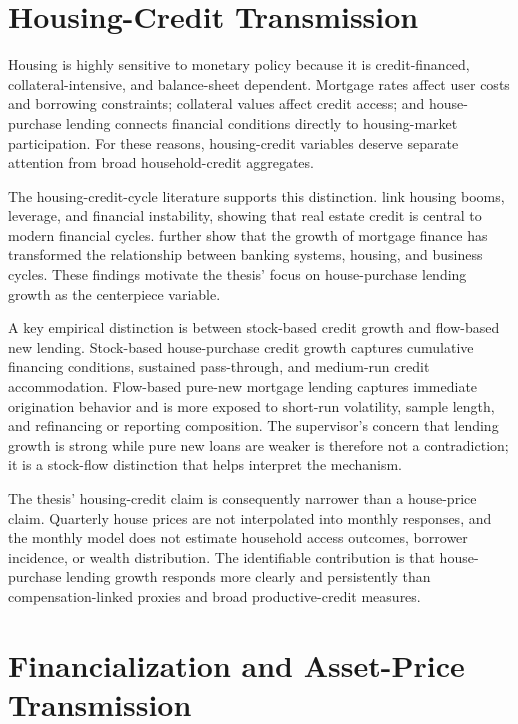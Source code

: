 \section{Housing-Credit Transmission}

Housing is highly sensitive to monetary policy because it is credit-financed, collateral-intensive, and balance-sheet dependent. Mortgage rates affect user costs and borrowing constraints; collateral values affect credit access; and house-purchase lending connects financial conditions directly to housing-market participation. For these reasons, housing-credit variables deserve separate attention from broad household-credit aggregates.

The housing-credit-cycle literature supports this distinction. \textcite{JordaSchularickTaylor2015} link housing booms, leverage, and financial instability, showing that real estate credit is central to modern financial cycles. \textcite{JordaSchularickTaylor2016} further show that the growth of mortgage finance has transformed the relationship between banking systems, housing, and business cycles. These findings motivate the thesis' focus on house-purchase lending growth as the centerpiece variable.

A key empirical distinction is between stock-based credit growth and flow-based new lending. Stock-based house-purchase credit growth captures cumulative financing conditions, sustained pass-through, and medium-run credit accommodation. Flow-based pure-new mortgage lending captures immediate origination behavior and is more exposed to short-run volatility, sample length, and refinancing or reporting composition. The supervisor's concern that lending growth is strong while pure new loans are weaker is therefore not a contradiction; it is a stock-flow distinction that helps interpret the mechanism.

The thesis' housing-credit claim is consequently narrower than a house-price claim. Quarterly house prices are not interpolated into monthly responses, and the monthly model does not estimate household access outcomes, borrower incidence, or wealth distribution. The identifiable contribution is that house-purchase lending growth responds more clearly and persistently than compensation-linked proxies and broad productive-credit measures.

\section{Financialization and Asset-Price Transmission}


